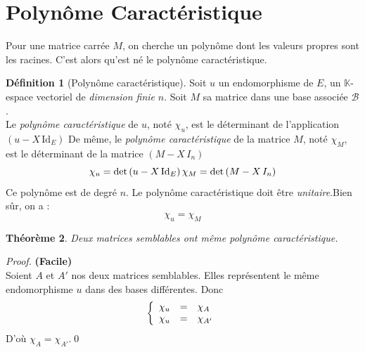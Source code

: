\documentclass[11pt,a4paper]{report}
\newtheorem{theorem}{Théorème}[chapter]
\theoremstyle{definition}
\newtheorem{dfn}[theorem]{Définition}
\begin{document}
\section{Polynôme Caractéristique}
Pour une matrice carrée $M$, on cherche un polynôme dont les valeurs propres sont les racines. C'est alors qu'est né le polynôme caractéristique. 
\begin{dfn}[Polynôme caractéristique]
Soit $u$ un endomorphisme de $E$, un $\mathbb{K}$-espace vectoriel de \emph{dimension finie} $n$. Soit $M$ sa matrice dans une base associée $\mathcal{B}$. \\
Le \emph{polynôme caractéristique} de $u$, noté $\chi_u$, est le déterminant de l'application $\left( u - X \, \mathrm{Id}_E \right)$\newline
De même, le \emph{polynôme caractéristique} de la matrice $M$, noté $\chi_M$, est le déterminant de la matrice $\left( M - X \, I_n \right)$
\begin{equation}
    \chi_u = \det\left( u - X \, \mathrm{Id}_E \right) \\ 
    \chi_M = \det\left( M - X \, I_n \right)
\end{equation}
Ce polynôme est de degré $n$. Le polynôme caractéristique doit être \emph{unitaire}.\newline Bien sûr, on a :
\begin{equation}
\chi_u = \chi_M
\end{equation}
\end{dfn}
\begin{theorem}
     Deux matrices semblables ont même polynôme caractéristique.
\end{theorem}
\begin{proof}%
     \textbf{(Facile)} \\
     Soient $A$ et $A'$ nos deux matrices semblables. Elles représentent le même endomorphisme $u$ dans des bases différentes. Donc 
     \[
        \left\lbrace
        \begin{array}{r c l}
          \chi_u &=& \chi_A \\
          \chi_u &=& \chi_{A'}
        \end{array}
        \right.
     \]
     D'où $\chi_A = \chi_{A'}$.\qed
\end{proof}
\end{document}

